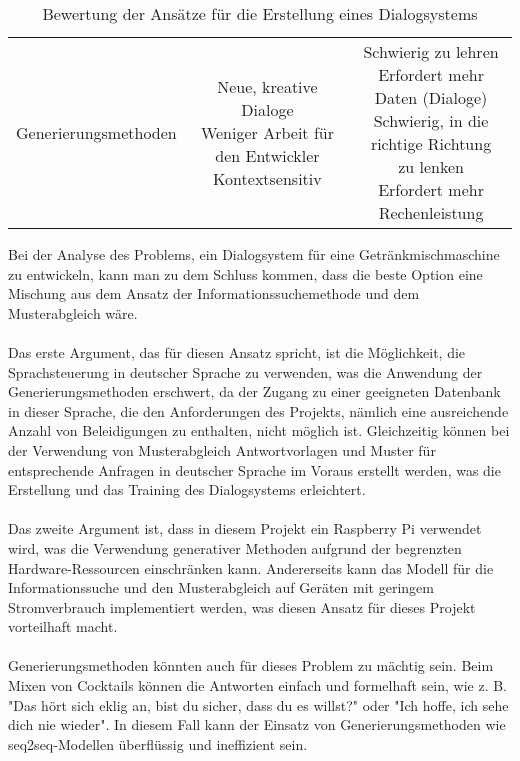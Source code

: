 \begin{table}[H]
\begin{tabular}{l|c|c}
        \hline
        Generierungsmethoden                & \makecell{Neue, kreative Dialoge \\ Weniger Arbeit für den Entwickler \\ Kontextsensitiv}           & \makecell{Schwierig zu lehren \\ Erfordert mehr Daten (Dialoge) \\ Schwierig, in die richtige Richtung \\ zu lenken \\Erfordert mehr Rechenleistung} \\
    \end{tabular}
    \caption{\label{table:Bewertungsmatrix_Konzepte_Dialogsysteme}Bewertung der Ansätze für die Erstellung eines Dialogsystems}
\end{table}
\noindent
Bei der Analyse des Problems, ein Dialogsystem für eine Getränkmischmaschine zu entwickeln, kann man zu dem Schluss kommen, dass die beste Option eine Mischung aus dem Ansatz der Informationssuchemethode und dem Musterabgleich wäre.\\\\
Das erste Argument, das für diesen Ansatz spricht, ist die Möglichkeit, die Sprachsteuerung in deutscher Sprache zu verwenden, was die Anwendung der Generierungsmethoden erschwert, da der Zugang zu einer geeigneten Datenbank in dieser Sprache, die den Anforderungen des Projekts, nämlich eine ausreichende Anzahl von Beleidigungen zu enthalten, nicht möglich ist. 
Gleichzeitig können bei der Verwendung von Musterabgleich Antwortvorlagen und Muster für entsprechende Anfragen in deutscher Sprache im Voraus erstellt werden, was die Erstellung und das Training des Dialogsystems erleichtert.\\\\
Das zweite Argument ist, dass in diesem Projekt ein Raspberry Pi verwendet wird, was die Verwendung generativer Methoden aufgrund der begrenzten Hardware-Ressourcen einschränken kann. 
Andererseits kann das Modell für die Informationssuche und den Musterabgleich auf Geräten mit geringem Stromverbrauch implementiert werden, was diesen Ansatz für dieses Projekt vorteilhaft macht.\\\\
Generierungsmethoden könnten auch für dieses Problem zu mächtig sein. 
Beim Mixen von Cocktails können die Antworten einfach und formelhaft sein, wie z. B. "Das hört sich eklig an, bist du sicher, dass du es willst?" oder "Ich hoffe, ich sehe dich nie wieder". 
In diesem Fall kann der Einsatz von Generierungsmethoden wie seq2seq-Modellen überflüssig und ineffizient sein. 

